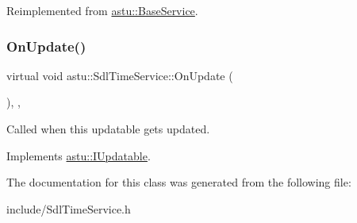 Reimplemented from \hyperlink{classastu_1_1BaseService_ac8710cd2d6dcc990db65e7c8ccfbc5ff}{astu\+::\+Base\+Service}.

\mbox{\label{classastu_1_1SdlTimeService_ada8347f0f665616a2202919e71b76302}} 
\subsubsection{\texorpdfstring{On\+Update()}{OnUpdate()}}
{\footnotesize\ttfamily virtual void astu\+::\+Sdl\+Time\+Service\+::\+On\+Update (\begin{DoxyParamCaption}{ }\end{DoxyParamCaption})\hspace{0.3cm}{\ttfamily [override]}, {\ttfamily [protected]}, {\ttfamily [virtual]}}

Called when this updatable gets updated. 

Implements \hyperlink{classastu_1_1IUpdatable_a76c7c6e2a71b725bbdbdf6808ef4743f}{astu\+::\+I\+Updatable}.



The documentation for this class was generated from the following file\+:\begin{DoxyCompactItemize}
\item 
include/Sdl\+Time\+Service.\+h\end{DoxyCompactItemize}
